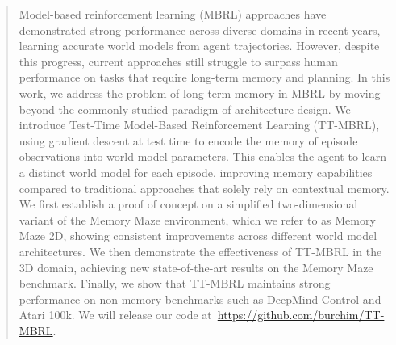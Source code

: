 \begin{abstract}
Model-based reinforcement learning (MBRL) approaches have demonstrated strong performance across diverse domains in recent years, learning accurate world models from agent trajectories. However, despite this progress, current approaches still struggle to surpass human performance on tasks that require long-term memory and planning. In this work, we address the problem of long-term memory in MBRL by moving beyond the commonly studied paradigm of architecture design. We introduce Test-Time Model-Based Reinforcement Learning (TT-MBRL), using gradient descent at test time to encode the memory of episode observations into world model parameters. This enables the agent to learn a distinct world model for each episode, improving memory capabilities compared to traditional approaches that solely rely on contextual memory. We first establish a proof of concept on a simplified two-dimensional variant of the Memory Maze environment, which we refer to as Memory Maze 2D, showing consistent improvements across different world model architectures. We then demonstrate the effectiveness of TT-MBRL in the 3D domain, achieving new state-of-the-art results on the Memory Maze benchmark. Finally, we show that TT-MBRL maintains strong performance on non-memory benchmarks such as DeepMind Control and Atari 100k. We will release our code at~\url{https://github.com/burchim/TT-MBRL}.
\end{abstract}
